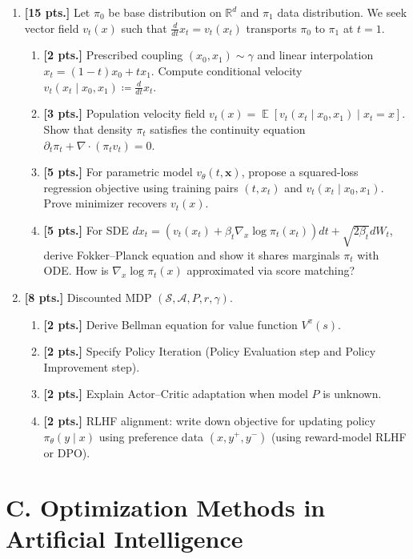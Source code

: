 \documentclass[11pt,a4paper]{article}
\DeclareMathOperator{\E}{\mathbb{E}}
\begin{document}
\begin{enumerate}[label=\textbf{(\arabic*)}]
    \item \textbf{[15 pts.]} Let $\pi_0$ be base distribution on $\mathbb{R}^d$ and $\pi_1$ data distribution. We seek vector field $v_t(x)$ such that $\frac{d}{dt} x_t = v_t(x_t)$ transports $\pi_0$ to $\pi_1$ at $t = 1$.
    \begin{enumerate}[label=(\a*)]
        \item \textbf{[2 pts.]} Prescribed coupling $(x_0, x_1) \sim \gamma$ and linear interpolation $x_t = (1-t)x_0 + t x_1$. Compute conditional velocity $v_t(x_t \mid x_0, x_1) \coloneqq \frac{d}{dt} x_t$.
        \item \textbf{[3 pts.]} Population velocity field $v_t(x) = \E [v_t(x_t \mid x_0, x_1) \mid x_t = x]$. Show that density $\pi_t$ satisfies the continuity equation $\partial_t \pi_t + \nabla \cdot (\pi_t v_t) = 0$.
        \item \textbf{[5 pts.]} For parametric model $v_\theta(t, \mathbf{x})$, propose a squared-loss regression objective using training pairs $(t, x_t)$ and $v_t(x_t \mid x_0, x_1)$. Prove minimizer recovers $v_t(x)$.
        \item \textbf{[5 pts.]} For SDE $d x_t = (v_t(x_t) + \beta_t \nabla_x \log \pi_t(x_t)) dt + \sqrt{2\beta_t} dW_t$, derive Fokker--Planck equation and show it shares marginals $\pi_t$ with ODE. How is $\nabla_x \log \pi_t(x)$ approximated via score matching?
    \end{enumerate}

    \item \textbf{[8 pts.]} Discounted MDP $(\mathcal{S}, \mathcal{A}, P, r, \gamma)$.
    \begin{enumerate}[label=(\a*)]
        \item \textbf{[2 pts.]} Derive Bellman equation for value function $V^\pi(s)$.
        \item \textbf{[2 pts.]} Specify Policy Iteration (Policy Evaluation step and Policy Improvement step).
        \item \textbf{[2 pts.]} Explain Actor--Critic adaptation when model $P$ is unknown.
        \item \textbf{[2 pts.]} RLHF alignment: write down objective for updating policy $\pi_\theta(y \mid x)$ using preference data $(x, y^+, y^-)$ (using reward-model RLHF or DPO).
    \end{enumerate}
\end{enumerate}

\section*{C. Optimization Methods in Artificial Intelligence}
\end{document}
